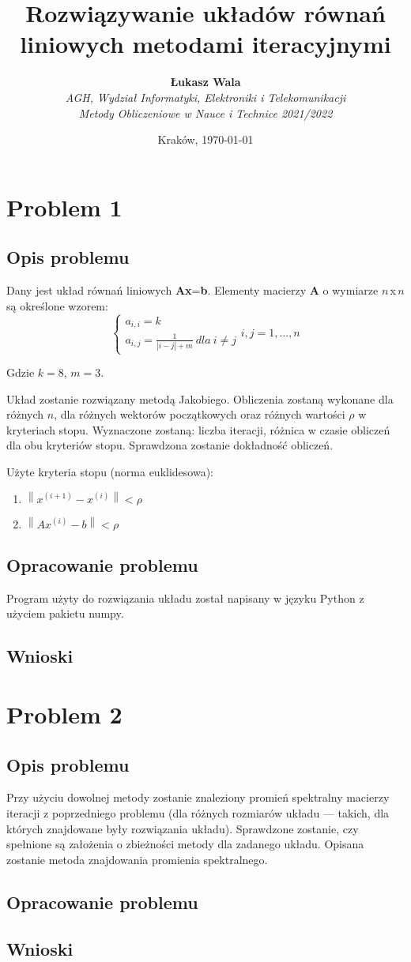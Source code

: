 \documentclass{article}
\title{Rozwiązywanie układów równań liniowych metodami iteracyjnymi}
\author{\textbf{Łukasz Wala}\\
    \textit{AGH, Wydział Informatyki, Elektroniki i Telekomunikacji} \\
    \textit{Metody Obliczeniowe w Nauce i Technice 2021/2022}}
\date{Kraków, \today}
\begin{document}
\maketitle

\section{Problem 1}
\subsection{Opis problemu}
Dany jest układ równań liniowych \textbf{Ax}=\textbf{b}.
Elementy macierzy \textbf{A} o wymiarze $n$\,x\,$n$ są określone wzorem:
$$
\begin{cases}
    a_{i,i}=k\\
    a_{i,j}=\frac{1}{|i-j|+m} \ dla \ i \ne j
\end{cases}i,j=1,...,n
$$

Gdzie $k=8$, $m=3$.

Układ zostanie rozwiązany metodą Jakobiego. Obliczenia zostaną wykonane dla różnych $n$,
dla różnych wektorów początkowych oraz różnych wartości $\rho$ w kryteriach stopu. Wyznaczone zostaną: liczba iteracji,
różnica w czasie obliczeń dla obu kryteriów stopu. Sprawdzona zostanie dokładność obliczeń.

Użyte kryteria stopu (norma euklidesowa):
\begin{enumerate}
    \item 
    $\left\|x^{(i+1)}-x^{(i)}\right\| < \rho$
    \item
    $\left\|Ax^{(i)}-b\right\| < \rho$
\end{enumerate}

\subsection{Opracowanie problemu}
Program użyty do rozwiązania układu został napisany w języku Python z użyciem pakietu numpy.

\subsection{Wnioski}




\section{Problem 2}
\subsection{Opis problemu}
Przy użyciu dowolnej metody zostanie znaleziony promień spektralny macierzy iteracji z poprzedniego problemu
(dla różnych rozmiarów układu --- takich, dla których znajdowane były rozwiązania układu).
Sprawdzone zostanie, czy spełnione są założenia o zbieżności metody dla zadanego układu. Opisana zostanie metoda znajdowania
promienia spektralnego.

\subsection{Opracowanie problemu}

\subsection{Wnioski}
\end{document}
